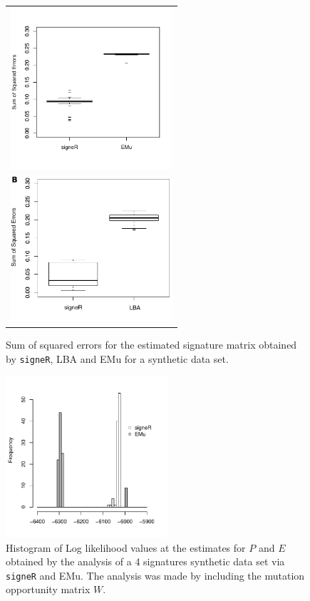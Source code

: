 \documentclass{bioinfo}
\begin{document}
\begin{figure}  
 \centering
   \begin{tabular}{c}
 \includegraphics[width=6cm]{figs/Simulation_signeR_vs_EMu_boxplot_SSE}
   \\
 \includegraphics[width=6cm]{figs/Simulation_signeR_vs_Alex_boxplot_SSE_P}
   \end{tabular}
  \caption{\textrm{%
    Sum of squared errors for the estimated signature matrix obtained
    by \texttt{signeR}, LBA and EMu for a synthetic data set. 
   }
  }
  \label{fig:synth_SSE}
\end{figure}
\begin{figure}  
 \centering
  \includegraphics[width=6cm]{figs/Simulation_signeR_vs_EMu_histogram_LLh_same_axis}
  \caption{\textrm{%
   Histogram of Log likelihood values at the estimates for $P$ and $E$
   obtained by the analysis of a 4 signatures synthetic data set via
   \texttt{signeR} and EMu. The analysis was made by including the
   mutation opportunity matrix $W$.
   }
  }
  \label{fig:synth_LLh}
\end{figure}
\end{document}
